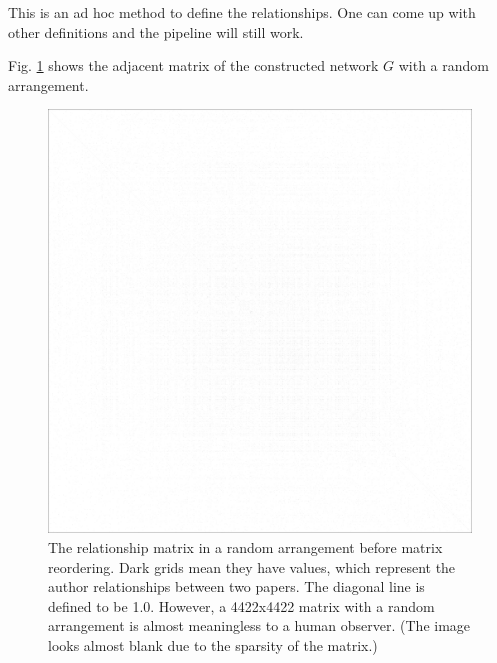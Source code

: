 This is an ad hoc method to define the relationships.
One can come up with other definitions and the pipeline will still work.

Fig. \ref{fig:matrix_random_arrangement} shows the adjacent matrix of the constructed network $G$ with a random arrangement.

\begin{figure}
    \centering
    \includegraphics[width=\textwidth]{images/random_arrangement.png}
    \caption{The relationship matrix in a random arrangement before matrix reordering. 
    Dark grids mean they have values, which represent the author relationships between two papers.
    The diagonal line is defined to be 1.0.
    However, a 4422x4422 matrix with a random arrangement is almost meaningless to a human observer.
    (The image looks almost blank due to the sparsity of the matrix.)
    }
    \label{fig:matrix_random_arrangement}
\end{figure}

